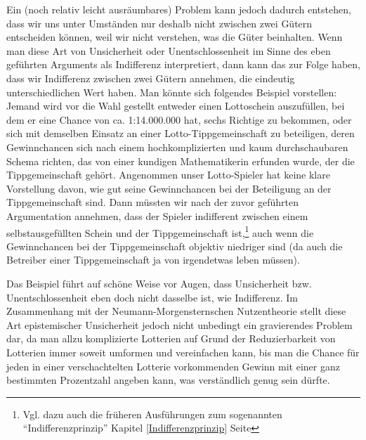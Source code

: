 Ein (noch relativ leicht ausräumbares) Problem kann jedoch dadurch entstehen,
dass wir uns unter Umständen nur deshalb nicht zwischen zwei Gütern entscheiden
können, weil wir nicht verstehen, was die Güter beinhalten. Wenn man diese Art
von  Unsicherheit oder
Unentschlossenheit im Sinne des eben geführten Arguments als Indifferenz
interpretiert, dann kann das zur Folge haben, dass wir Indifferenz zwischen zwei
Gütern annehmen, die eindeutig unterschiedlichen Wert haben. Man könnte sich
folgendes Beispiel vorstellen: Jemand wird vor die Wahl gestellt entweder einen
Lottoschein auszufüllen, bei dem er eine Chance von ca. 1:14.000.000 hat, sechs
Richtige zu bekommen, oder sich mit demselben Einsatz an einer
Lotto-Tippgemeinschaft zu beteiligen, deren Gewinnchancen sich nach einem
hochkomplizierten und kaum durchschaubaren Schema richten, das von einer kundigen
Mathematikerin erfunden wurde, der die Tippgemeinschaft gehört. Angenommen unser
Lotto-Spieler hat keine klare Vorstellung davon, wie gut seine Gewinnchancen bei
der Beteiligung an der Tippgemeinschaft sind. Dann müssten wir nach der zuvor
geführten Argumentation annehmen, dass der Spieler indifferent zwischen einem
selbstausgefüllten Schein und der Tippgemeinschaft ist,\footnote{Vgl. dazu auch
die früheren Ausführungen zum sogenannten ``Indifferenzprinzip'' Kapitel
\ref{Indifferenzprinzip} Seite \pageref {Indifferenzprinzip}} auch wenn die
Gewinnchancen bei der Tippgemeinschaft objektiv niedriger sind (da auch die
Betreiber einer Tippgemeinschaft ja von irgendetwas leben müssen).

Das Beispiel führt auf schöne Weise vor Augen, dass Unsicherheit bzw.
Unentschlossenheit eben doch nicht dasselbe ist, wie Indifferenz. Im Zusammenhang
mit der Neumann-Morgensternschen Nutzentheorie stellt diese Art epistemischer
Unsicherheit jedoch nicht unbedingt ein gravierendes Problem dar, da man allzu
komplizierte Lotterien auf Grund der Reduzierbarkeit von Lotterien immer soweit
umformen und vereinfachen kann, bis man die Chance für jeden in einer
verschachtelten Lotterie vorkommenden Gewinn mit einer ganz bestimmten
Prozentzahl angeben kann, was verständlich genug sein dürfte.

